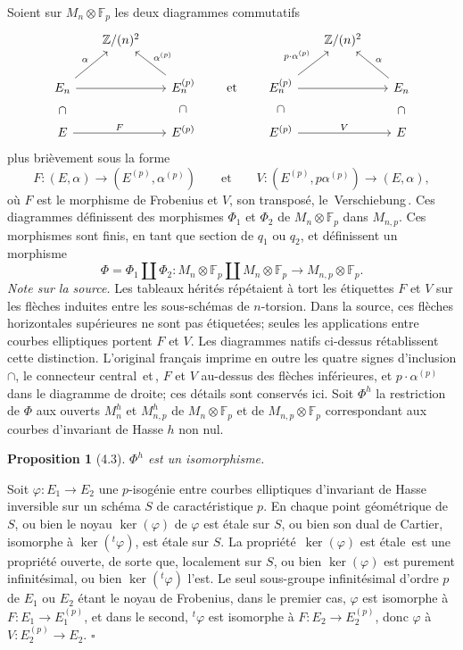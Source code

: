 \documentclass[10pt]{article}
\newcommand{\Z}{\mathbb Z}
\newcommand{\QED}{\hfill$\square$}
\newcommand{\F}{\mathbb F}
\newcommand{\frquote}[1]{\guillemotleft{}\,#1\,\guillemotright{}}
\newtheorem*{proposition}{Proposition}
\begin{document}
Soient sur $M_n\otimes\F_p$ les deux diagrammes commutatifs
\begin{equation*}
\begin{tikzcd}[column sep=1.7em,row sep=1.8em]
& \Z/(n)^2 &&&& \Z/(n)^2 & \\
E_n \arrow[ur,"\alpha"] \arrow[rr] \arrow[d,phantom,"\cap" description] &&
E_n^{(p)} \arrow[ul,"\alpha^{(p)}"'] \arrow[d,phantom,"\cap" description] & \text{et} &
E_n^{(p)} \arrow[ur,"p\mathbin{\cdot}\alpha^{(p)}"] \arrow[rr] \arrow[d,phantom,"\cap" description] &&
E_n \arrow[ul,"\alpha"'] \arrow[d,phantom,"\cap" description] \\
E \arrow[rr,"F"] && E^{(p)} && E^{(p)} \arrow[rr,"V"] && E
\end{tikzcd}
\end{equation*}
plus brièvement sous la forme
\[
F:(E,\alpha)\to(E^{(p)},\alpha^{(p)})
\qquad\text{et}\qquad
V:(E^{(p)},p\alpha^{(p)})\to(E,\alpha),
\]
où $F$ est le morphisme de Frobenius et $V$, son transposé, le \frquote{Verschiebung}. Ces diagrammes définissent des morphismes $\Phi_1$ et $\Phi_2$ de $M_n\otimes\F_p$ dans $M_{n,p}$. Ces morphismes sont finis, en tant que section de $q_1$ ou $q_2$, et définissent un morphisme
\[
\Phi=\Phi_1\coprod\Phi_2:M_n\otimes\F_p\coprod M_n\otimes\F_p\to M_{n,p}\otimes\F_p.
\]
\noindent\emph{Note sur la source.} Les tableaux hérités répétaient à tort les étiquettes $F$ et $V$ sur les flèches induites entre les sous-schémas de $n$-torsion. Dans la source, ces flèches horizontales supérieures ne sont pas étiquetées; seules les applications entre courbes elliptiques portent $F$ et $V$. Les diagrammes natifs ci-dessus rétablissent cette distinction. L'original français imprime en outre les quatre signes d'inclusion $\cap$, le connecteur central \frquote{et}, $F$ et $V$ au-dessus des flèches inférieures, et $p\mathbin{\cdot}\alpha^{(p)}$ dans le diagramme de droite; ces détails sont conservés ici.
Soit $\Phi^h$ la restriction de $\Phi$ aux ouverts $M_n^h$ et $M_{n,p}^h$ de $M_n\otimes\F_p$ et de $M_{n,p}\otimes\F_p$ correspondant aux courbes d'invariant de Hasse $h$ non nul.

\begin{proposition}[4.3]
$\Phi^h$ est un isomorphisme.
\end{proposition}

Soit $\varphi:E_1\to E_2$ une $p$-isogénie entre courbes elliptiques d'invariant de Hasse inversible sur un schéma $S$ de caractéristique $p$. En chaque point géométrique de $S$, ou bien le noyau $\ker(\varphi)$ de $\varphi$ est étale sur $S$, ou bien son dual de Cartier, isomorphe à $\ker({}^{t}\!\varphi)$, est étale sur $S$. La propriété \frquote{$\ker(\varphi)$ est étale} est une propriété ouverte, de sorte que, localement sur $S$, ou bien $\ker(\varphi)$ est purement infinitésimal, ou bien $\ker({}^{t}\!\varphi)$ l'est. Le seul sous-groupe infinitésimal d'ordre $p$ de $E_1$ ou $E_2$ étant le noyau de Frobenius, dans le premier cas, $\varphi$ est isomorphe à $F:E_1\to E_1^{(p)}$, et dans le second, ${}^{t}\!\varphi$ est isomorphe à $F:E_2\to E_2^{(p)}$, donc $\varphi$ à $V:E_2^{(p)}\to E_2$. \QED
\end{document}
